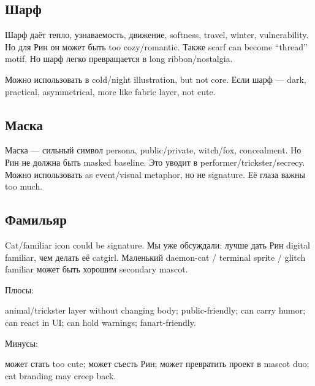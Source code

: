 \subsection*{Шарф}

Шарф даёт тепло, узнаваемость, движение, softness, travel, winter,
vulnerability. Но для Рин он может быть too cozy/\hspace{0pt}romantic. Также scarf
can become ``thread'' motif. Но шарф легко превращается в long
ribbon/\hspace{0pt}nostalgia.

Можно использовать в cold/\hspace{0pt}night illustration, but not core. Если шарф
--- dark, practical, asymmetrical, more like fabric layer, not cute.

\subsection*{Маска}

Маска --- сильный символ persona, public/\hspace{0pt}private, witch/\hspace{0pt}fox,
concealment. Но Рин не должна быть masked baseline. Это уводит в
performer/\hspace{0pt}trickster/\hspace{0pt}secrecy. Можно использовать as event/\hspace{0pt}visual
metaphor, но не signature. Её глаза важны too much.

\subsection*{Фамильяр}

Cat/\hspace{0pt}familiar icon could be signature. Мы уже обсуждали: лучше дать Рин
digital familiar, чем делать её catgirl. Маленький daemon-cat /\hspace{0pt} terminal
sprite /\hspace{0pt} glitch familiar может быть хорошим secondary mascot.

Плюсы:

animal/\hspace{0pt}trickster layer without changing body; public-friendly; can carry
humor; can react in UI; can hold warnings; fanart-friendly.

Минусы:

может стать too cute; может съесть Рин; может превратить проект в mascot
duo; cat branding may creep back.

